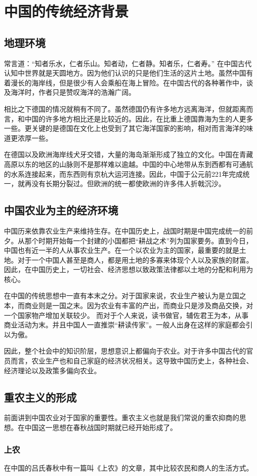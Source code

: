 \section{中国的传统经济背景}

\subsection{地理环境}

常言道：“知者乐水，仁者乐山。知者动，仁者静。知者乐，仁者寿。” 在中国古代认知中世界就是天圆地方。因为他们认识的只是他们生活的这片土地。虽然中国有着漫长的海岸线，但是很少有人会乘船在海上冒险。在中国古代的各种著作中，谈及海洋时，作者只是赞叹海洋的浩瀚广阔。

相比之下德国的情况就稍有不同了。虽然德国仍有许多地方远离海洋，但就距离而言，和中国的许多地方相比还是比较近的。因此，在比重上德国靠海为生的人更多一些。更关键的是德国在文化上也受到了其它海洋国家的影响，相对而言海洋的味道更浓厚一些。

在德国以及欧洲海岸线犬牙交错，大量的海岛渐渐形成了独立的文化。中国在青藏高原以东的地区的山脉则不是那样难以逾越。中国的中心地带从东到西都有可通航的水系连接起来，而东西则有京杭大运河连接。因此，中国于公元前221年完成统一，就再没有长期分裂过。但欧洲的统一都使欧洲的许多伟人折戟沉沙。

\subsection{中国农业为主的经济环境}

中国历来依靠农业生产来维持生存。在中国历史上，战国时期是中国完成统一的前夕。从那个时期开始每一个封建的小国都把“耕战之术”列为国家要务。直到今日，中国也有近一半的人从事农业生产。在一个以农业为主的国家，最重要的就是土地。对于一个中国人甚至是商人，都是用土地的多寡来体现个人以及家族的财富。因此，在中国历史上，一切社会、经济思想以致政策法律都以土地的分配和利用为核心。


在中国的传统思想中一直有本末之分。对于国家来说，农业生产被认为是立国之本，而商业则是一国之末。因为农业有丰富的产出，而商业只是涉及商品交换，对一个国家物产增加关联较少。
而对于个人来说，读书做官，辅佐君王为本，从事商业活动为末。并且中国人一直推崇“耕读传家”。一般人出身在这样的家庭都会引以为傲。

因此，整个社会中的知识阶层，思想意识上都偏向于农业。对于许多中国古代的官员而言，农业生产也和自己家庭的经济状况相关。这导致中国历史上，各种社会、经济理论以及政策多偏向农业。

\subsection{重农主义的形成}

前面讲到中国农业对于国家的重要性。重农主义也就是我们常说的重农抑商的思想。在中国这一思想在春秋战国时期就已经开始形成了。

\subsubsection{上农}

在中国的吕氏春秋中有一篇叫《上农》的文章，其中比较农民和商人的生活方式。